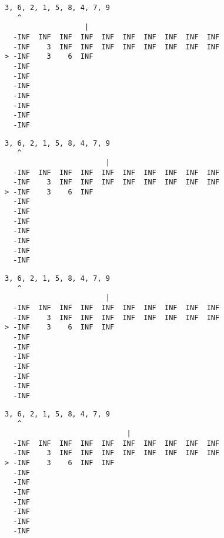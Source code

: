 { \begin{verbatim}
3, 6, 2, 1, 5, 8, 4, 7, 9
   ^
                   |
  -INF  INF  INF  INF  INF  INF  INF  INF  INF  INF
  -INF    3  INF  INF  INF  INF  INF  INF  INF  INF
> -INF    3    6  INF                              
  -INF                                             
  -INF                                             
  -INF                                             
  -INF                                             
  -INF                                             
  -INF                                             
  -INF                                             
\end{verbatim} }

{ \begin{verbatim}
3, 6, 2, 1, 5, 8, 4, 7, 9
   ^
                        |
  -INF  INF  INF  INF  INF  INF  INF  INF  INF  INF
  -INF    3  INF  INF  INF  INF  INF  INF  INF  INF
> -INF    3    6  INF                              
  -INF                                             
  -INF                                             
  -INF                                             
  -INF                                             
  -INF                                             
  -INF                                             
  -INF                                             
\end{verbatim} }

{ \begin{verbatim}
3, 6, 2, 1, 5, 8, 4, 7, 9
   ^
                        |
  -INF  INF  INF  INF  INF  INF  INF  INF  INF  INF
  -INF    3  INF  INF  INF  INF  INF  INF  INF  INF
> -INF    3    6  INF  INF                         
  -INF                                             
  -INF                                             
  -INF                                             
  -INF                                             
  -INF                                             
  -INF                                             
  -INF                                             
\end{verbatim} }

{ \begin{verbatim}
3, 6, 2, 1, 5, 8, 4, 7, 9
   ^
                             |
  -INF  INF  INF  INF  INF  INF  INF  INF  INF  INF
  -INF    3  INF  INF  INF  INF  INF  INF  INF  INF
> -INF    3    6  INF  INF                         
  -INF                                             
  -INF                                             
  -INF                                             
  -INF                                             
  -INF                                             
  -INF                                             
  -INF                                             
\end{verbatim} }

